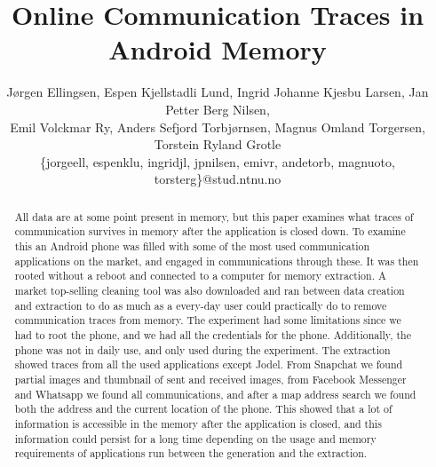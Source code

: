 \documentclass[10pt]{sig-alternate-05-2015}
\begin{document}
\title{Online Communication Traces in Android Memory}

\author{
J{\o}rgen Ellingsen, Espen Kjellstadli Lund, Ingrid Johanne Kjesbu Larsen, Jan Petter Berg Nilsen,\\
Emil Volckmar Ry, Anders Sefjord Torbj{\o}rnsen, Magnus Omland Torgersen, Torstein Ryland Grotle
\\\{jorgeell, espenklu, ingridjl, jpnilsen, emivr, andetorb, magnuoto, torsterg\}@stud.ntnu.no
}

\maketitle
\begin{abstract}
All data are at some point present in memory, but this paper examines what traces of communication survives in memory after the application is closed down. To examine this an Android phone was filled with some of the most used communication applications on the market, and engaged in communications through these. It was then rooted without a reboot and connected to a computer for memory extraction. A market top-selling cleaning tool was also downloaded and ran between data creation and extraction to do as much as a every-day user could practically do to remove communication traces from memory. The experiment had some limitations since we had to root the phone, and we had all the credentials for the phone. Additionally, the phone was not in daily use, and only used during the experiment. The extraction showed traces from all the used applications except Jodel. From Snapchat we found partial images and thumbnail of sent and received images, from Facebook Messenger and Whatsapp we found all communications, and after a map address search we found both the address and the current location of the phone. This showed that a lot of information is accessible in the memory after the application is closed, and this information could persist for a long time depending on the usage and memory requirements of applications run between the generation and the extraction. 
\end{abstract}
















  
\end{document}
